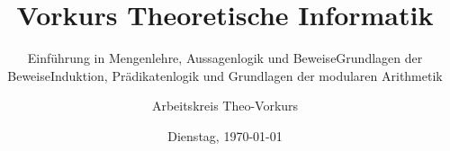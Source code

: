 %
%
%
%



\title{Vorkurs Theoretische Informatik}

\if{}
    \subtitle{Einführung in Mengenlehre, Aussagenlogik und Beweise}
    \newcommand\daynamestr{Dienstag}
\fi
\if{}
    \subtitle{Grundlagen der Beweise}
    \newcommand\daynamestr{Mittwoch}
    \AdvanceDate
\fi
\if{}
    \subtitle{Induktion, Prädikatenlogik und Grundlagen der modularen Arithmetik}
    \newcommand\daynamestr{Donnerstag}
    \AdvanceDate\AdvanceDate
\fi


\date{\daynamestr, \today}

\author{Arbeitskreis Theo-Vorkurs}

